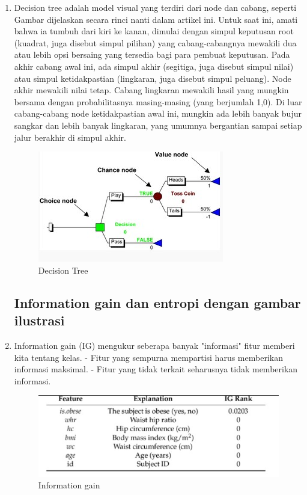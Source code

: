 \begin{enumerate}
\item Decision tree adalah model visual yang terdiri dari node dan cabang, seperti Gambar dijelaskan secara rinci nanti dalam artikel ini. Untuk saat ini, amati bahwa ia tumbuh dari kiri ke kanan, dimulai dengan simpul keputusan root (kuadrat, juga disebut simpul pilihan) yang cabang-cabangnya mewakili dua atau lebih opsi bersaing yang tersedia bagi para pembuat keputusan. Pada akhir cabang awal ini, ada simpul akhir (segitiga, juga disebut simpul nilai) atau simpul ketidakpastian (lingkaran, juga disebut simpul peluang). Node akhir mewakili nilai tetap. Cabang lingkaran mewakili hasil yang mungkin bersama dengan probabilitasnya masing-masing (yang berjumlah 1,0). Di luar cabang-cabang node ketidakpastian awal ini, mungkin ada lebih banyak bujur sangkar dan lebih banyak lingkaran, yang umumnya bergantian sampai setiap jalur berakhir di simpul akhir.
\begin{figure}[ht]
\centering
\includegraphics[scale=0.5]{figures/f6.jpg}
\caption{Decision Tree}
\label{contoh}
\end{figure}

\subsection{Information gain dan entropi dengan gambar ilustrasi}

\item Information gain (IG) mengukur seberapa banyak "informasi" fitur memberi kita tentang kelas. - Fitur yang sempurna mempartisi harus memberikan informasi maksimal. - Fitur yang tidak terkait seharusnya tidak memberikan informasi.
\begin{figure}[ht]
\centering
\includegraphics[scale=0.5]{figures/f7.jpg}
\caption{Information gain}
\label{contoh}
\end{figure}


\end{enumerate}
